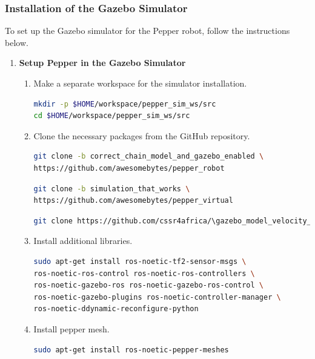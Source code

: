 \documentclass{CSSRforAfrica}
\begin{document}
{\subsubsection*{Installation of the Gazebo Simulator}
To set up the Gazebo simulator for the Pepper robot, follow the instructions below.

\begin{enumerate}
\item \textbf{Setup Pepper in the Gazebo Simulator}
\begin{enumerate}
    \item Make a separate workspace for the simulator installation.
\begin{lstlisting}[style=withoutNumbering, language=bash]
mkdir -p $HOME/workspace/pepper_sim_ws/src
cd $HOME/workspace/pepper_sim_ws/src
\end{lstlisting} 

    \item Clone the necessary packages from the GitHub repository.
\begin{lstlisting}[style=withoutNumbering, language=bash]
git clone -b correct_chain_model_and_gazebo_enabled \
https://github.com/awesomebytes/pepper_robot
\end{lstlisting} 

\begin{lstlisting}[style=withoutNumbering, language=bash]
git clone -b simulation_that_works \
https://github.com/awesomebytes/pepper_virtual
\end{lstlisting} 

\begin{lstlisting}[style=withoutNumbering, language=bash]
git clone https://github.com/cssr4africa/\gazebo_model_velocity_plugin
\end{lstlisting} 

\item Install additional libraries.
\begin{lstlisting}[style=withoutNumbering, language=bash]
sudo apt-get install ros-noetic-tf2-sensor-msgs \
ros-noetic-ros-control ros-noetic-ros-controllers \
ros-noetic-gazebo-ros ros-noetic-gazebo-ros-control \
ros-noetic-gazebo-plugins ros-noetic-controller-manager \
ros-noetic-ddynamic-reconfigure-python
\end{lstlisting}

\item Install pepper mesh.
\begin{lstlisting}[style=withoutNumbering, language=bash]
sudo apt-get install ros-noetic-pepper-meshes
\end{lstlisting}


\end{enumerate}
\end{enumerate}}
\end{document}
